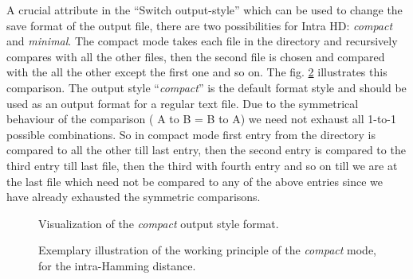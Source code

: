 A crucial attribute in the ``Switch output-style'' which can be used to change the save format of the output file, there are two possibilities for Intra HD: \emph{compact} and \emph{minimal}. The compact mode takes each file in the directory and recursively compares with all the other files, then the second file is chosen and compared with the all the other except the first one and so on. The fig. \ref{img:4_intra_WP} illustrates this comparison.  The output style ``\emph{compact}'' is the default format style and should be used
as an output format for a regular text file. Due to the symmetrical behaviour of the comparison ( A to B = B to A) we need not exhaust all 1-to-1 possible combinations. So in compact mode first entry from the directory is compared to all the other till last entry, then the second entry is compared to the third entry till last file, then the third with fourth entry and so on till we are at the last file which need not be compared to any of the above entries since we have already exhausted the
symmetric comparisons.\\

\begin{figure}
\centering
{}
\caption{Visualization of the \emph{compact} output style format.}
\label{img:4_intra_compact}
\end{figure}

\begin{figure}
\centering
{}
\caption{Exemplary illustration of the working principle of the \emph{compact} mode, for the intra-Hamming distance.}
\label{img:4_intra_WP}
\end{figure}

